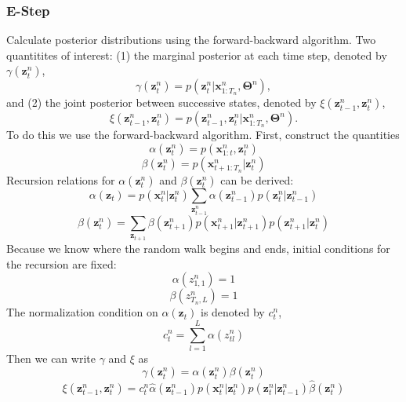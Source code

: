 \documentclass[10pt]{article}
\begin{document}
\subsubsection{E-Step}
Calculate posterior distributions using the forward-backward algorithm. Two quantitites of interest: (1) the marginal posterior at each time step, denoted by $\gamma(\mathbf{z}_t^n)$,
\begin{equation}
\gamma(\mathbf{z}_t^n) = p(\mathbf{z}_t^n|\mathbf{x}_{1:T_n}^n,\mathbf{\Theta}^n),
\end{equation}
and (2) the joint posterior between successive states, denoted by $\xi(\mathbf{z}_{t-1}^n,\mathbf{z}_{t}^n)$,
\begin{equation}
\xi(\mathbf{z}_{t-1}^n,\mathbf{z}_t^n) = p(\mathbf{z}_{t-1}^n,\mathbf{z}_t^n|\mathbf{x}_{1:T_n}^n,\mathbf{\Theta}^n).
\end{equation}
To do this we use the forward-backward algorithm. First, construct the quantities
\begin{equation}
\alpha(\mathbf{z}_t^n)=p(\mathbf{x}_{1:t}^n,\mathbf{z}_t^n)
\end{equation}
\begin{equation}
\beta(\mathbf{z}_t^n)=p(\mathbf{x}_{t+1:T_n}^n|\mathbf{z}_t^n)
\end{equation}
Recursion relations for $\alpha(\mathbf{z}_t^n)$ and $\beta(\mathbf{z}_t^n)$ can be derived:
\begin{equation}
\alpha(\mathbf{z}_t) = p(\mathbf{x}_t^n|\mathbf{z}_t^n)\displaystyle\sum_{\mathbf{z}_{t-1}^n}\alpha(\mathbf{z}_{t-1}^n)p(\mathbf{z}_t^n|\mathbf{z}_{t-1}^n)
\end{equation}
\begin{equation}
\beta(\mathbf{z}_t^n) = \displaystyle\sum_{\mathbf{z}_{t+1}}\beta(\mathbf{z}_{t+1}^n)p(\mathbf{x}_{t+1}^n|\mathbf{z}_{t+1}^n)p(\mathbf{z}_{t+1}^n|\mathbf{z}_t^n)
\end{equation}
Because we know where the random walk begins and ends, initial conditions for the recursion are fixed:
\begin{equation}
\alpha(z_{1,1}^n) = 1
\end{equation}
\begin{equation}
\beta(z_{T_n,L}^n) = 1 
\end{equation}
The normalization condition on $\alpha(\mathbf{z}_t)$ is denoted by $c_t^n$, 
\begin{equation}
c_t^n = \displaystyle\sum_{l=1}^{L} \alpha(z_{tl}^n)
\end{equation}
Then we can write $\gamma$ and $\xi$ as
\begin{equation}
\gamma(\mathbf{z}_t^n) = \alpha(\mathbf{z}_t^n)\beta(\mathbf{z}_t^n)
\end{equation}
\begin{equation}
\xi(\mathbf{z}_{t-1}^n,\mathbf{z}_{t}^n) = c_t^n \hat{\alpha}(\mathbf{z}_{t-1}^n)p(\mathbf{x}_t^n|\mathbf{z}_t^n)p(\mathbf{z}_t^n|\mathbf{z}_{t-1}^n)\hat{\beta}(\mathbf{z}_t^n)
\end{equation}
\end{document}
